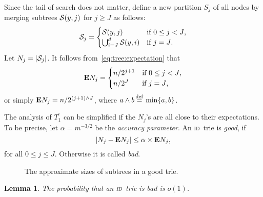 \documentclass{article}
\newcommand{\id}{{\scshape id}}
\newcommand{\Thead}{{T_1^\prime}}
\newcommand\cS{{\cal S}}
\newcommand{\e}{{\textbf E}}
\newcommand{\eqd}{\,{\buildrel {\rm def} \over =}\,}
\newtheorem{lemma}{Lemma}
\begin{document}
Since the tail of search does not matter, define a new partition $S_j$ of all nodes by
merging subtrees $\cS(y,j)$ for $j \ge J$ as follows:
$$
\cS_j =
\begin{cases}
\cS(y,j) & \text{if $0 \le j < J$,} \\
\bigcup_{i=J}^{d} \cS(y,i) & \text{if $j = J$}.
\end{cases}
$$
Let $N_j = |\cS_j|$. It follows from~\eqref{eq:tree:expectation} that
\begin{align}
    \e N_j =
    \begin{cases}
        {n}/{2^{j+1}}  & \text{if $0 \le j < J$,} \\
        {n}/{2^{J}} & \text{if $j = J$},
    \end{cases}
    \label{eq:N:expectation}
\end{align}
or simply $\e N_j = n/2^{(j+1)\wedge J}$, where $a \wedge b \eqd \min\{a,b\}$.

The analysis of $\Thead$ can be simplified if the $N_j$'s are all close to their
expectations. To be precise, let $\alpha = m^{-3/2}$ be the \emph{accuracy
parameter}. An \id\ trie is \emph{good}, if
$$
\left| N_j - \e N_j \right| \le \alpha \times \e N_j,
$$
for all $0 \le j \le J$. Otherwise it is called \emph{bad}.

\begin{figure}
\caption[]{The approximate sizes of subtrees in a good trie.}
\label{fig:tree}
\end{figure}

\begin{lemma}
    \label{lem:pleasant}
    The probability that an \id\ trie is bad is $o(1)$.
\end{lemma}
\end{document}

